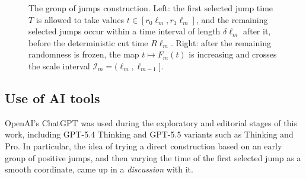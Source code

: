 \documentclass[11pt]{article}
\newcommand{\1}{\mathbf 1}
\begin{document}
\begin{figure}[H]
\begin{minipage}[t]{0.47\textwidth}
\vspace{1mm}
\centering
{}
\end{minipage}

\caption{The group of jumps construction. Left: the first selected jump time $T$ is allowed to take values $t\in[r_0\ell_m,r_1\ell_m]$, and the remaining selected jumps occur within a time interval of length $\delta\ell_m$ after it, before the deterministic cut time $R\ell_m$. Right: after the remaining randomness is frozen, the map $t\mapsto F_m(t)$ is increasing and crosses the scale interval $\mathcal I_m=(\ell_m,\ell_{m-1}]$.}
\label{fig:group}
\end{figure}


\subsection{Use of AI tools}

OpenAI's ChatGPT was used during the exploratory and editorial stages of this work, including GPT-5.4 Thinking and GPT-5.5 variants such as Thinking and Pro. In particular, the idea of trying a direct construction based on an early group of positive jumps, and then varying the time of the first selected jump as a smooth coordinate, came up in a \textit{discussion} with it. 
\end{document}
